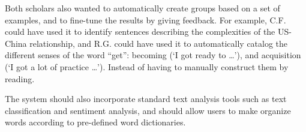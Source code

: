 \documentclass{sig-alternate}
\begin{document}
Both scholars also wanted to automatically create groups based on a set of examples, and to fine-tune the results by giving feedback. For example, C.F. could have used it to identify sentences describing the complexities of the US-China relationship, and R.G. could have used it to automatically catalog the different senses of the word ``get'':  becoming (`I got ready to \ldots'), and acquisition (`I got a lot of practice \ldots'). Instead of having to manually construct them by reading.
 
The system should also incorporate standard text analysis tools such as text classification and sentiment analysis, and should allow users to make organize words according to pre-defined word dictionaries.


 
  
\end{document}
